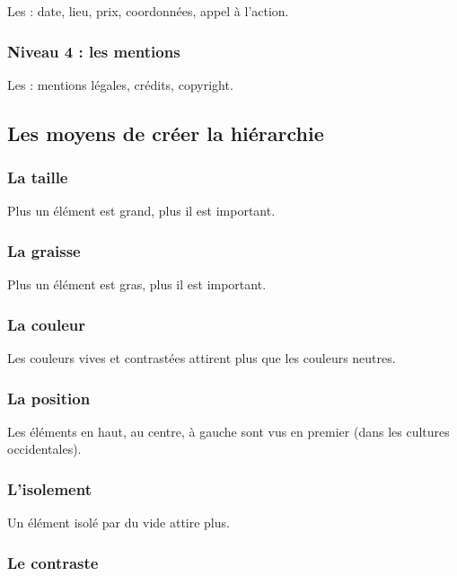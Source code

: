 Les  : date, lieu, prix, coordonnées, appel à l'action.

\subsubsection{Niveau 4 : les mentions}

Les  : mentions légales, crédits, copyright.

\subsection{Les moyens de créer la hiérarchie}

\subsubsection{La taille}

Plus un élément est grand, plus il est important.

\subsubsection{La graisse}

Plus un élément est gras, plus il est important.

\subsubsection{La couleur}

Les couleurs vives et contrastées attirent plus que les couleurs neutres.

\subsubsection{La position}

Les éléments en haut, au centre, à gauche sont vus en premier (dans les cultures occidentales).

\subsubsection{L'isolement}

Un élément isolé par du vide attire plus.

\subsubsection{Le contraste}


